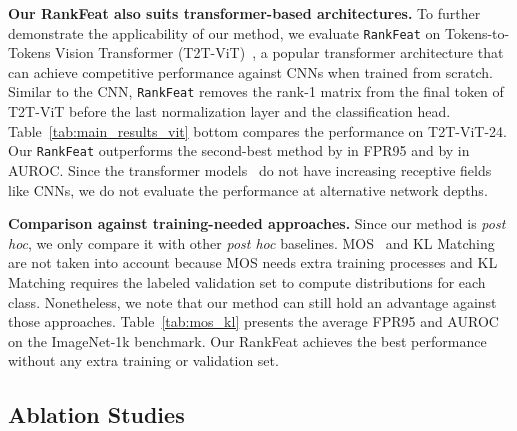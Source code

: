 \noindent \textbf{Our RankFeat also suits transformer-based architectures.} To further demonstrate the applicability of our method, we evaluate \texttt{RankFeat} on Tokens-to-Tokens Vision Transformer (T2T-ViT)~\cite{yuan2021tokens}, a popular transformer architecture that can achieve competitive performance against CNNs when trained from scratch. Similar to the CNN, \texttt{RankFeat} removes the rank-1 matrix from the final token of T2T-ViT before the last normalization layer and the classification head. Table~\ref{tab:main_results_vit} bottom compares the performance on T2T-ViT-24. Our \texttt{RankFeat} outperforms the second-best method by  in FPR95 and by  in AUROC. Since the transformer models~\cite{dosovitskiy2020image,yuan2021tokens} do not have increasing receptive fields like CNNs, we do not evaluate the performance at alternative network depths. 


\noindent \textbf{Comparison against training-needed approaches.} Since our method is \emph{post hoc}, we only compare it with other \emph{post hoc} baselines. MOS~\cite{huang2021mos} and KL Matching~\cite{hendrycks2019scaling} are not taken into account because MOS needs extra training processes and KL Matching requires the labeled validation set to compute distributions for each class. Nonetheless, we note that our method can still hold an advantage against those approaches. Table~\ref{tab:mos_kl} presents the average FPR95 and AUROC on the ImageNet-1k benchmark. Our RankFeat achieves the best performance without any extra training or validation set.

\begin{table}[htbp]
    \centering
    \caption{Comparison against training-needed methods on ImageNet-1k based on ResNetv2-101~\cite{he2016identity}.}
    \label{tab:mos_kl}
\end{table}

\subsection{Ablation Studies}
\label{sec:exp_ablation}

